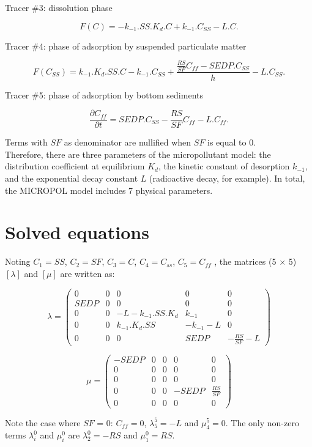 Tracer $\#$3: dissolution phase

\begin{equation}
  F(C) = -k_{-1}.SS.K_d.C + k_{-1}.C_{SS} - L.C.
\end{equation}

Tracer $\#$4: phase of adsorption by suspended particulate matter

\begin{equation}
  F(C_{SS}) = k_{-1}.K_d.SS.C - k_{-1}.C_{SS} + \frac{\frac{RS}{SF}C_{ff}-SEDP.C_{SS}}{h}- L.C_{SS}.
\end{equation}

Tracer $\#$5: phase of adsorption by bottom sediments

\begin{equation}
  \frac{\partial C_{ff}}{\partial t} = SEDP.C_{SS} - \frac{RS}{SF} C_{ff} - L.C_{ff}.
\end{equation}

Terms with $SF$ as denominator are nullified when $SF$ is equal to 0.\\

Therefore, there are three parameters of the micropollutant model:
the distribution coefficient at equilibrium $K_d$,
the kinetic constant of desorption $k_{-1}$,
and the exponential decay constant $L$ (radioactive decay, for example).
In total, the MICROPOL model includes 7 physical parameters.

\section{Solved equations}

Noting $C_1 = SS$, $C_2 = SF$, $C_3 =C$, $C_4 = C_{ss}$, $C_5 = C_{ff}$ ,
the matrices (5 $\times$ 5) $[\lambda]$ and $[\mu]$
are written as:

$$  \lambda = 
  \begin{pmatrix}
    0 & 0 & 0 & 0 & 0\\
    SEDP & 0 & 0 & 0 & 0\\
    0 & 0 & -L -k_{-1}.SS.K_d & k_{-1} & 0\\
    0 & 0 & k_{-1}.K_d.SS & -k_{-1} - L & 0\\
    0 & 0 & 0 & SEDP & -\frac{RS}{SF}-L
  \end{pmatrix}
$$  

$$  \mu = 
  \begin{pmatrix}
    -SEDP & 0 & 0 & 0 & 0\\
    0 & 0 & 0 & 0 & 0\\
    0 & 0 & 0 & 0 & 0\\
    0 & 0 & 0 & -SEDP & \frac{RS}{SF}\\
    0 & 0 & 0 & 0 & 0
  \end{pmatrix}
$$  

Note the case where $SF$ = 0: $C_{ff} = 0$, $\lambda_5^5 = -L$ and $\mu_4^5 = 0$.
The only non-zero terms $\lambda_i^0$ and $\mu_i^0$ are $\lambda_2^0 = -RS$ and $\mu_1^0 = RS$.

